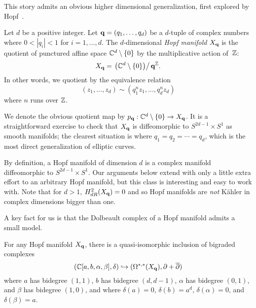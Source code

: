 This story admits an obvious higher dimensional generalization, first explored by Hopf~\cite{Hopf}.

\begin{dfn}
Let $d$ be a positive integer.
Let ${\bf q} = (q_1,\ldots, q_d)$ be a $d$-tuple of complex numbers where $0 < |q_i| < 1$ for $i = 1, \ldots, d$. 
The $d$-dimensional {\em Hopf manifold} $X_{\bf q}$ is the quotient of punctured affine space $\mathbb C^d \setminus \{0\}$ by the multiplicative action of~$\mathbb Z$:
\[
X_{\bf q} = \left. \left(\mathbb C^d \setminus \{0\}\right) \right/ {\bf q}^\mathbb Z.  
\]
In other words, we quotient by the equivalence relation
\[
(z_1,\ldots,z_d) \sim (q_1^{n} z_1, \ldots,q_d^{n} z_d)
\]
where $n$ runs over $\mathbb Z$.
\end{dfn}


We denote the obvious quotient map by $p_{\bf q} : \mathbb C^d \setminus \{0\} \to X_{\bf q}$. 
It is a straightforward exercise to check that $X_{\bf q}$ is diffeomorphic to $S^{2d-1} \times S^1$ as smooth manifolds;
the clearest situation is where $q_1 = q_2 = \cdots = q_d$,
which is the most direct generalization of elliptic curves.

\begin{rmk}
By definition, a Hopf manifold of dimension $d$ is a complex manifold diffeomorphic to $S^{2d-1} \times S^1$. 
Our arguments below extend with only a little extra effort to an arbitrary Hopf manifold, 
but this class is interesting and easy to work with.
Note that for $d>1$, $H^{2}_{dR} (X_{\bf q}) = 0$ and so Hopf manifolds are {\em not} K\"{a}hler in complex dimensions bigger than one. 
\end{rmk}

A key fact for us is that the Dolbeault complex of a Hopf manifold admits a small model.

\begin{lem}\label{lem:tanre}
For any Hopf manifold $X_{\bf q}$, there is a quasi-isomorphic inclusion of bigraded complexes
\[
(\mathbb C[a, b, \alpha, \beta], \delta) \hookrightarrow (\Omega^{*,*}(X_{\bf q}), \partial + \overline{\partial})
\]
where $a$ has bidegree $(1,1)$, $b$ has bidegree $(d,d-1)$, $\alpha$ has bidegree $(0,1)$, and $\beta$ has bidegree $(1,0)$, and where $\delta(a) = 0$, $\delta(b) = a^{d}$, $\delta(\alpha) = 0$, and $\delta(\beta) = a$.
\end{lem}

